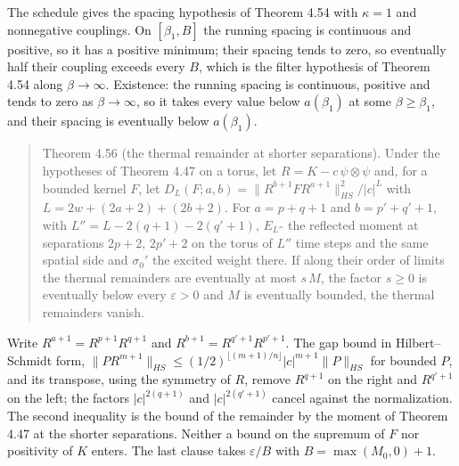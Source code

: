 \documentclass[10pt,letterpaper,twocolumn]{article}
\begin{document}
The schedule gives the spacing hypothesis of Theorem 4.54 with \(\kappa=1\) and nonnegative couplings. On \([\beta_1,B]\) the running spacing is continuous and positive, so it has a positive minimum; their spacing tends to zero, so eventually half their coupling exceeds every \(B\), which is the filter hypothesis of Theorem 4.54 along \(\beta\to\infty\). Existence: the running spacing is continuous, positive and tends to zero as \(\beta\to\infty\), so it takes every value below \(a(\beta_1)\) at some \(\beta\ge\beta_1\), and their spacing is eventually below \(a(\beta_1)\).

\begin{quote}
Theorem 4.56 (the thermal remainder at shorter separations). Under the hypotheses of Theorem 4.47 on a torus, let \(R=K-c\,\psi\otimes\psi\) and, for a bounded kernel \(F\), let \(D_L(F;a,b)=\lVert R^{b+1}FR^{a+1}\rVert_{HS}^2/\lvert c\rvert^{L}\) with \(L=2w+(2a+2)+(2b+2)\). For \(a=p+q+1\) and \(b=p'+q'+1\),
with \(L''=L-2(q+1)-2(q'+1)\), \(E_{L''}\) the reflected moment at separations \(2p+2\), \(2p'+2\) on the torus of \(L''\) time steps and the same spatial side and \(\sigma_0'\) the excited weight there. If along their order of limits the thermal remainders are eventually at most \(s\,M\), the factor \(s\ge0\) is eventually below every \(\varepsilon>0\) and \(M\) is eventually bounded, the thermal remainders vanish.
\end{quote}

Write \(R^{a+1}=R^{p+1}R^{q+1}\) and \(R^{b+1}=R^{q'+1}R^{p'+1}\). The gap bound in Hilbert--Schmidt form, \(\lVert PR^{m+1}\rVert_{HS}\le(1/2)^{\lfloor(m+1)/n\rfloor}\lvert c\rvert^{m+1}\lVert P\rVert_{HS}\) for bounded \(P\), and its transpose, using the symmetry of \(R\), remove \(R^{q+1}\) on the right and \(R^{q'+1}\) on the left; the factors \(\lvert c\rvert^{2(q+1)}\) and \(\lvert c\rvert^{2(q'+1)}\) cancel against the normalization. The second inequality is the bound of the remainder by the moment of Theorem 4.47 at the shorter separations. Neither a bound on the supremum of \(F\) nor positivity of \(K\) enters. The last clause takes \(\varepsilon/B\) with \(B=\max(M_0,0)+1\).
\end{document}
